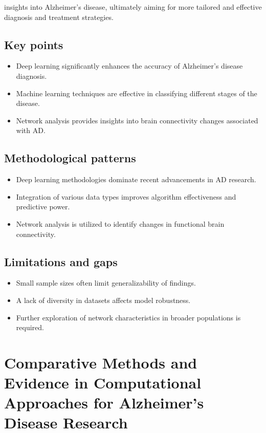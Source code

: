 \documentclass{MITcsail}
\begin{document}
insights into Alzheimer’s disease, ultimately aiming for more tailored and effective diagnosis and treatment strategies.

\subsection*{Key points}
\begin{itemize}
  \item Deep learning significantly enhances the accuracy of Alzheimer's disease diagnosis.
  \item Machine learning techniques are effective in classifying different stages of the disease.
  \item Network analysis provides insights into brain connectivity changes associated with AD.
\end{itemize}

\subsection*{Methodological patterns}
\begin{itemize}
  \item Deep learning methodologies dominate recent advancements in AD research.
  \item Integration of various data types improves algorithm effectiveness and predictive power.
  \item Network analysis is utilized to identify changes in functional brain connectivity.
\end{itemize}

\subsection*{Limitations and gaps}
\begin{itemize}
  \item Small sample sizes often limit generalizability of findings.
  \item A lack of diversity in datasets affects model robustness.
  \item Further exploration of network characteristics in broader populations is required.
\end{itemize}

\section{Comparative Methods and Evidence in Computational Approaches for Alzheimer's Disease Research}
\end{document}
